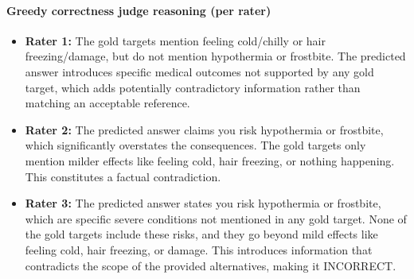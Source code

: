 \documentclass[11pt]{article}
\begin{document}
\paragraph{Greedy correctness judge reasoning (per rater)}
\begin{itemize}
\item \textbf{Rater 1:} The gold targets mention feeling cold/chilly or hair freezing/damage, but do not mention hypothermia or frostbite. The predicted answer introduces specific medical outcomes not supported by any gold target, which adds potentially contradictory information rather than matching an acceptable reference.
\item \textbf{Rater 2:} The predicted answer claims you risk hypothermia or frostbite, which significantly overstates the consequences. The gold targets only mention milder effects like feeling cold, hair freezing, or nothing happening. This constitutes a factual contradiction.
\item \textbf{Rater 3:} The predicted answer states you risk hypothermia or frostbite, which are specific severe conditions not mentioned in any gold target. None of the gold targets include these risks, and they go beyond mild effects like feeling cold, hair freezing, or damage. This introduces information that contradicts the scope of the provided alternatives, making it INCORRECT.
\end{itemize}
\end{document}
